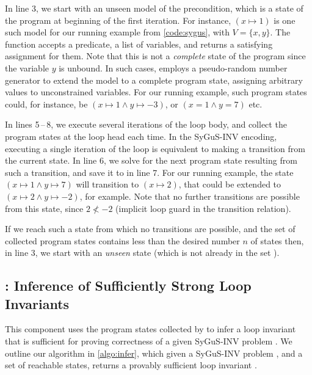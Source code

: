 \documentclass[conference]{IEEEtran}
\begin{document}
In line 3, we start with an unseen model of the precondition,
which is a state of the program at beginning of the first iteration.
For instance, $(x \mapsto 1)$ is one such model for our running example from \cref{code:sygus}, with $V = \{x, y\}$.
The \GetModel function accepts a predicate, a list of variables,
and returns a satisfying assignment for them.
Note that this is not a \emph{complete} state of the program since the variable $y$ is unbound.
In such cases, \GetModel employs a pseudo-random number generator to extend the model to a complete program state,
assigning arbitrary values to unconstrained variables.
For our running example, such program states could, for instance,
be $(x \mapsto 1 \wedge y \mapsto -3)$, or $(x = 1 \wedge y = 7)$ etc.

In lines 5\,--\,8, we execute several iterations of the loop body, and collect the program states at the loop head each time.
In the SyGuS-INV encoding, executing a single iteration of the loop is equivalent to making a transition from the current state.
In line 6, we solve for the next program state resulting from such a transition, and save it to \States in line 7.
For our running example, the state $(x \mapsto 1 \wedge y \mapsto 7)$ will transition to $(x \mapsto 2)$,
that could be extended to $(x \mapsto 2 \wedge y \mapsto -2)$, for example.
Note that no further transitions are possible from this state,
since $2 \not< -2$ (implicit loop guard in the transition relation).

If we reach such a state from which no transitions are possible,
and the set \States of collected program states contains less than the desired number $n$ of states then, in line 3,
we start with an \emph{unseen} state (which is not already in the set \States).




\subsection{\Infer: Inference of Sufficiently Strong Loop Invariants} \label{subsec:Infer}

\noindent
This component uses the program states collected by \Record to infer a loop invariant that is sufficient
for proving correctness of a given SyGuS-INV problem \SyGuSINVTriplet.
We outline our \Infer algorithm in \cref{algo:infer}, which given a SyGuS-INV problem \SyGuSINVTriplet,
and a set \States of reachable states, returns a provably sufficient loop invariant \Inv.
\end{document}
